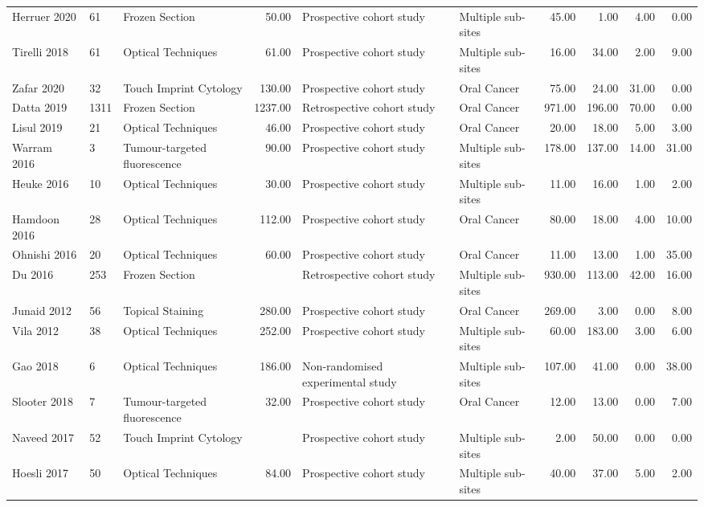 \begin{table}[ht]
\begin{tabular}{lllrllrrrr}
  Herruer 2020 & 61 & Frozen Section & 50.00 & Prospective cohort study & Multiple sub-sites & 45.00 & 1.00 & 4.00 & 0.00 \\ 
  Tirelli 2018 & 61 & Optical Techniques & 61.00 & Prospective cohort study & Multiple sub-sites & 16.00 & 34.00 & 2.00 & 9.00 \\ 
  Zafar 2020 & 32 & Touch Imprint Cytology & 130.00 & Prospective cohort study & Oral Cancer & 75.00 & 24.00 & 31.00 & 0.00 \\ 
  Datta 2019 & 1311 & Frozen Section & 1237.00 & Retrospective cohort study & Oral Cancer & 971.00 & 196.00 & 70.00 & 0.00 \\ 
  Lisul 2019 & 21 & Optical Techniques & 46.00 & Prospective cohort study & Oral Cancer & 20.00 & 18.00 & 5.00 & 3.00 \\ 
  Warram 2016 & 3 & Tumour-targeted fluorescence & 90.00 & Prospective cohort study & Multiple sub-sites & 178.00 & 137.00 & 14.00 & 31.00 \\ 
  Heuke 2016 & 10 & Optical Techniques & 30.00 & Prospective cohort study & Multiple sub-sites & 11.00 & 16.00 & 1.00 & 2.00 \\ 
  Hamdoon 2016 & 28 & Optical Techniques & 112.00 & Prospective cohort study & Oral Cancer & 80.00 & 18.00 & 4.00 & 10.00 \\ 
  Ohnishi 2016 & 20 & Optical Techniques & 60.00 & Prospective cohort study & Oral Cancer & 11.00 & 13.00 & 1.00 & 35.00 \\ 
  Du 2016 & 253 & Frozen Section &  & Retrospective cohort study & Multiple sub-sites & 930.00 & 113.00 & 42.00 & 16.00 \\ 
  Junaid 2012 & 56 & Topical Staining & 280.00 & Prospective cohort study & Oral Cancer & 269.00 & 3.00 & 0.00 & 8.00 \\ 
  Vila 2012 & 38 & Optical Techniques & 252.00 & Prospective cohort study & Multiple sub-sites & 60.00 & 183.00 & 3.00 & 6.00 \\ 
  Gao 2018 & 6 & Optical Techniques & 186.00 & Non-randomised experimental study & Multiple sub-sites & 107.00 & 41.00 & 0.00 & 38.00 \\ 
  Slooter 2018 & 7 & Tumour-targeted fluorescence & 32.00 & Prospective cohort study & Oral Cancer & 12.00 & 13.00 & 0.00 & 7.00 \\ 
  Naveed 2017 & 52 & Touch Imprint Cytology &  & Prospective cohort study & Multiple sub-sites & 2.00 & 50.00 & 0.00 & 0.00 \\ 
  Hoesli 2017 & 50 & Optical Techniques & 84.00 & Prospective cohort study & Multiple sub-sites & 40.00 & 37.00 & 5.00 & 2.00 \\ 

\end{tabular}
\end{table}
